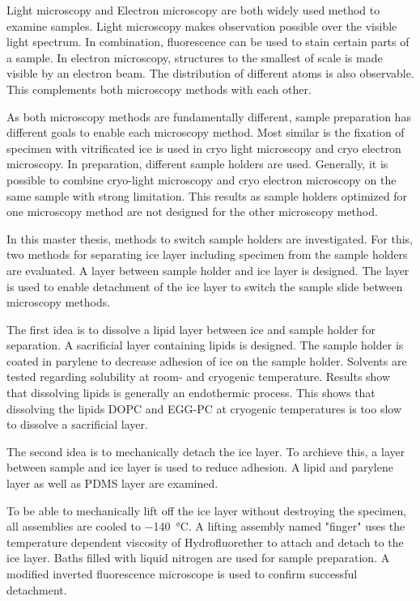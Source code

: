 Light microscopy and Electron microscopy are both widely used method to examine samples. Light microscopy makes observation possible over the visible light spectrum. In combination, fluorescence can be used to stain certain parts of a sample. In electron microscopy, structures to the smallest of scale is made visible by an electron beam. The distribution of different atoms is also observable. This complements both microscopy methods with each other.

As both microscopy methods are fundamentally different, sample preparation has different goals to enable each microscopy method. Most similar is the fixation of specimen with vitrificated ice is used in cryo light microscopy and cryo electron microscopy. In preparation, different sample holders are used. Generally, it is possible to combine cryo-light microscopy and cryo electron microscopy on the same sample with strong limitation. This results as sample holders optimized for one microscopy method are not designed for the other microscopy method.

In this master thesis, methods to switch sample holders are investigated. For this, two methods for separating ice layer including specimen from the sample holders are evaluated. A layer between sample holder and ice layer is designed. The layer is used to enable detachment of the ice layer to switch the sample slide between microscopy methods. 

The first idea is to dissolve a lipid layer between ice and sample holder for separation. A sacrificial layer containing lipids is designed. The sample holder is coated in parylene to decrease adhesion of ice on the sample holder. Solvents are tested regarding solubility at room- and cryogenic temperature. Results show that dissolving lipids is generally an endothermic process. This shows that dissolving the lipids DOPC and EGG-PC at cryogenic temperatures is too slow to dissolve a sacrificial layer. 

The second idea is to mechanically detach the ice layer. To archieve this, a layer between sample and ice layer is used to reduce adhesion. A lipid and parylene layer as well as PDMS layer are examined. 

To be able to mechanically lift off the ice layer without destroying the specimen, all assemblies are cooled to \SI{-140}{\degreeCelsius}. A lifting assembly named "finger" uses the temperature dependent viscosity of Hydrofluorether to attach and detach to the ice layer. Baths filled with liquid nitrogen are used for sample preparation. A modified inverted fluorescence microscope is used to confirm successful detachment.

